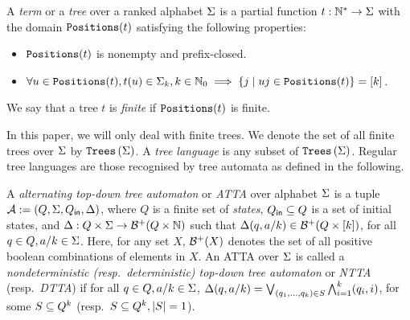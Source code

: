 \begin{definition}\label{def:tree}
    A \emph{term} or a \emph{tree} over a ranked alphabet $\Sigma$ is a partial function $t : \mathbb{N}^* \to \Sigma$ with the domain $\texttt{Positions}(t)$ satisfying the following properties:
    \begin{itemize}
        \item $\texttt{Positions}(t)$ is nonempty and prefix-closed.
        \item $\forall u \in \texttt{Positions}(t), t(u) \in \Sigma_k, k \in \mathbb{N}_0 \implies \{j \mid uj \in \texttt{Positions}(t)\} = \left[ k \right]$.
    \end{itemize}
    We say that a tree $t$ is \emph{finite} if $\texttt{Positions}(t)$ is finite.
\end{definition}
In this paper, we will only deal with finite trees. We denote the set of all finite trees over $\Sigma$ by $\texttt{Trees}\left(\Sigma\right)$. A \emph{tree language} is any subset of $\texttt{Trees}\left(\Sigma\right)$. Regular tree languages are those recognised by tree automata as defined in the following.

\begin{definition}\label{def:alternatingTreeAutomaton}
    A \emph{alternating top-down tree automaton} or \emph{ATTA} over alphabet $\Sigma$ is a tuple $\mathcal{A} := (Q, \Sigma, Q_\textsf{in}, \Delta)$, where $Q$ is a finite set of \emph{states}, $Q_\textsf{in} \subseteq Q$ is a set of initial states, and $\Delta : Q \times \Sigma \to \mathcal{B}^+(Q \times \mathbb{N})$ such that $\Delta(q, a/k) \in \mathcal{B}^+(Q \times \left[ k \right])$, for all $q \in Q, a/k \in \Sigma$. Here, for any set $X$, $\mathcal{B}^+(X)$ denotes the set of all positive boolean combinations of elements in $X$. An ATTA over $\Sigma$ is called a \emph{nondeterministic (resp.~deterministic) top-down tree automaton} or \emph{NTTA} (resp.~\emph{DTTA}) if for all $q \in Q, a/k \in \Sigma$, $\Delta(q, a/k) = \bigvee_{(q_1, \dots, q_k) \in S} \bigwedge_{i=1}^{k} (q_i, i)$, for some $S \subseteq Q^k$ (resp.~$S \subseteq Q^k, \left\lvert S \right\rvert = 1$).
\end{definition}

